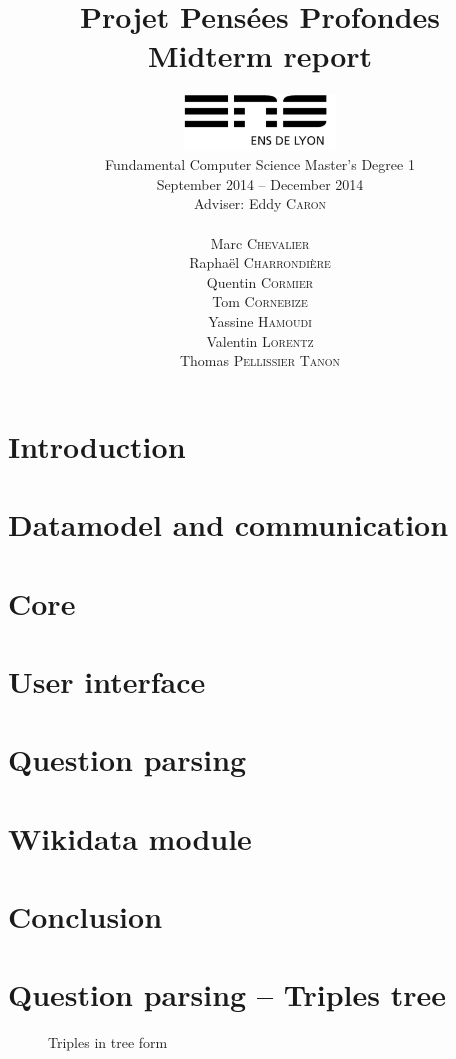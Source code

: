 \documentclass[a4paper,10pt]{report}
\title{Projet Pensées Profondes\\\large Midterm report}
\author{\includegraphics[width=0.3\textwidth]{../logo_ensl.pdf}\\[50pt]
Fundamental Computer Science Master's Degree 1\\September 2014 \--- December 2014\\[50pt]
Adviser: Eddy \textsc{Caron}\\[50pt]
\begin{minipage}{0.4\textwidth}
    \begin{flushleft} \large
        Marc \textsc{Chevalier}
        \\
        Raphaël \textsc{Charrondière}
        \\
        Quentin \textsc{Cormier}
        \\
        Tom \textsc{Cornebize}
    \end{flushleft}
\end{minipage}
\begin{minipage}{0.4\textwidth}
    \begin{flushright} \large
        Yassine \textsc{Hamoudi}
        \\
        Valentin \textsc{Lorentz}
        \\
        Thomas \textsc{Pellissier Tanon}
        \\
    \end{flushright}
\end{minipage}
}
\date{}
\begin{document}
\maketitle



\tableofcontents

\chapter*{Introduction}
    

\chapter{Datamodel and communication}
    

\chapter{Core}
    

\chapter{User interface}
    

\chapter{Question parsing}
    
    
    
    

\chapter{Wikidata module}
    

\chapter*{Conclusion}
    

\appendix



\nocite{*}

\chapter{Question parsing \--- Triples tree}

\begin{figure}[!ht]
\caption{Triples in tree form}
\label{triple_tree}

\end{figure}
\end{document}
